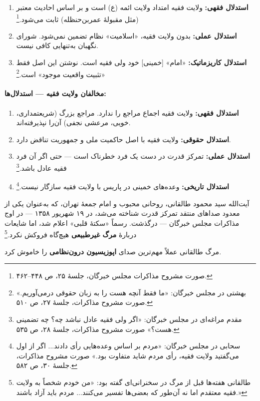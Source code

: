 \documentclass[12pt,a4paper]{book}
\newcommand{\keyword}[1]{\textbf{\textcolor{cPrimary}{#1}}}
\newcommand{\en}[1]{\lr{\textit{#1}}}
\begin{document}
\begin{enumerate}[label=\textcolor{cPrimary}{\bfseries\arabic*.}, rightmargin=2em]
    \item \textbf{استدلال فقهی:} ولایت فقیه امتداد ولایت ائمه (ع) است و بر اساس احادیث معتبر (مثل مقبولهٔ عمر‌بن‌حنظله) ثابت می‌شود.\footnote{صورت مشروح مذاکرات مجلس خبرگان، جلسهٔ ۲۵، ص ۴۴۸–۴۶۲.}
    
    \item \textbf{استدلال عملی:} بدون ولایت فقیه، «اسلامیت» نظام تضمین نمی‌شود. شورای نگهبان به‌تنهایی کافی نیست.
    
    \item \textbf{استدلال کاریزماتیک:} «امام» [خمینی] خود ولی فقیه است. نوشتن این اصل فقط «تثبیت واقعیت موجود» است.\footnote{بهشتی در مجلس خبرگان: «ما فقط آنچه هست را به زبان حقوقی درمی‌آوریم.» صورت مشروح مذاکرات، جلسهٔ ۲۷، ص ۵۱۰.}
\end{enumerate}

\paragraph{مخالفان ولایت فقیه — استدلال‌ها:}

\begin{enumerate}[label=\textcolor{cAccent}{\bfseries\arabic*.}, rightmargin=2em]
    \item \textbf{استدلال فقهی:} ولایت فقیه اجماع مراجع را ندارد. مراجع بزرگ (شریعتمداری، خویی، مرعشی نجفی) آن‌را نپذیرفته‌اند.
    
    \item \textbf{استدلال حقوقی:} ولایت فقیه با اصل حاکمیت ملی و جمهوریت تناقض دارد.
    
    \item \textbf{استدلال عملی:} تمرکز قدرت در دست یک فرد خطرناک است — حتی اگر آن فرد فقیه عادل باشد.\footnote{مقدم مراغه‌ای در مجلس خبرگان: «اگر ولی فقیه عادل نباشد چه؟ چه تضمینی هست؟» صورت مشروح مذاکرات، جلسهٔ ۲۸، ص ۵۳۵.}
    
    \item \textbf{استدلال تاریخی:} وعده‌های خمینی در پاریس با ولایت فقیه سازگار نیست.\footnote{سحابی در مجلس خبرگان: «مردم بر اساس وعده‌هایی رأی دادند... اگر از اول می‌گفتید ولایت فقیه، رأی مردم شاید متفاوت بود.» صورت مشروح مذاکرات، جلسهٔ ۳۰، ص ۵۸۲.}
\end{enumerate}

\begin{warningBox}
آیت‌الله سید محمود طالقانی، روحانی محبوب و امام جمعهٔ تهران، که به‌عنوان یکی از معدود صداهای منتقد تمرکز قدرت شناخته می‌شد، در ۱۹ شهریور ۱۳۵۸ — در اوج مذاکرات مجلس خبرگان — درگذشت. رسماً «سکتهٔ قلبی» اعلام شد، اما شایعات دربارهٔ \keyword{مرگ غیرطبیعی} هیچ‌گاه فروکش نکرد.\footnote{طالقانی هفته‌ها قبل از مرگ در سخنرانی‌ای گفته بود: «من خودم شخصاً به ولایت فقیه معتقدم اما نه آن‌طور که بعضی‌ها تفسیر می‌کنند... مردم باید آزاد باشند.» \en{Moin (1999), pp.\,218--219.}}

مرگ طالقانی عملاً مهم‌ترین صدای \keyword{اپوزیسیون درون‌نظامی} را خاموش کرد.
\end{warningBox}
\end{document}
